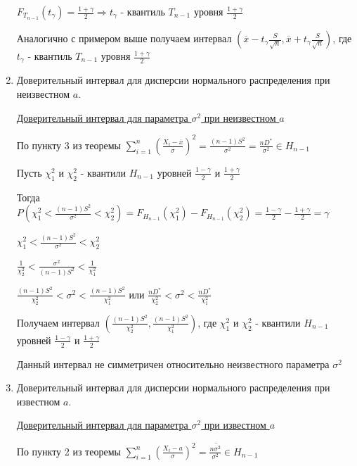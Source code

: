 \documentclass[12pt]{article}
\begin{document}
\begin{enumerate}
    $F_{T_{n - 1}}(t_\gamma) = \frac{1 + \gamma}{2} \Longrightarrow t_\gamma$ - квантиль $T_{n - 1}$ уровня 
    $\frac{1 + \gamma}{2}$

    Аналогично с примером выше получаем интервал $\left(\overline{x} - t_\gamma \frac{S}{\sqrt{n}}, 
    \overline{x} + t_\gamma \frac{S}{\sqrt{n}}\right)$, 
    где $t_\gamma$ - квантиль $T_{n - 1}$ уровня $\frac{1 + \gamma}{2}$

    \item Доверительный интервал для дисперсии нормального распределения при неизвестном $a$.

    \hyperlink{confidence_interval_for_sigma_unknown_a}{Доверительный интервал для параметра $\sigma^2$ при неизвестном $a$}

    По пункту 3 из теоремы $\sum_{i = 1}^n \left(\frac{X_i - \overline{x}}{\sigma}\right)^2 = \frac{(n - 1)S^2}{\sigma^2} = 
    \frac{nD^*}{\sigma^2} \in H_{n - 1}$

    Пусть $\chi_1^2$ и $\chi_2^2$ - квантили $H_{n - 1}$ уровней $\frac{1 - \gamma}{2}$ и $\frac{1 + \gamma}{2}$

    Тогда $P\left(\chi_1^2 < \frac{(n - 1)S^2}{\sigma^2} < \chi_2^2\right) = F_{H_{n - 1}}(\chi_1^2) - F_{H_{n - 1}}(\chi_2^2) = \frac{1 - \gamma}{2} - \frac{1 + \gamma}{2} = \gamma$

    $\chi_1^2 < \frac{(n - 1)S^2}{\sigma^2} < \chi_2^2$

    $\frac{1}{\chi_2^2} < \frac{\sigma^2}{(n - 1)S^2} < \frac{1}{\chi_1^2}$

    $\frac{(n - 1)S^2}{\chi_2^2} < \sigma^2 < \frac{(n - 1)S^2}{\chi_1^2}$ или 
    $\frac{nD^*}{\chi_2^2} < \sigma^2 < \frac{nD^*}{\chi_1^2}$

    Получаем интервал $\left(\frac{(n - 1)S^2}{\chi_2^2}, \frac{(n - 1)S^2}{\chi_1^2}\right)$, где $\chi_1^2$ и $\chi_2^2$ - квантили $H_{n - 1}$ уровней $\frac{1 - \gamma}{2}$ и $\frac{1 + \gamma}{2}$

    \Nota Данный интервал не симметричен относительно неизвестного параметра $\sigma^2$

    \item Доверительный интервал для дисперсии нормального распределения при известном $a$.

    \hyperlink{confidence_interval_for_sigma_known_a}{Доверительный интервал для параметра $\sigma^2$ при известном $a$}

    По пункту 2 из теоремы $\sum_{i = 1}^n \left(\frac{X_i - a}{\sigma}\right)^2 = \frac{n \tilde{\sigma^2}}{\sigma^2} \in H_{n - 1}$
    

\end{enumerate}
\end{document}
